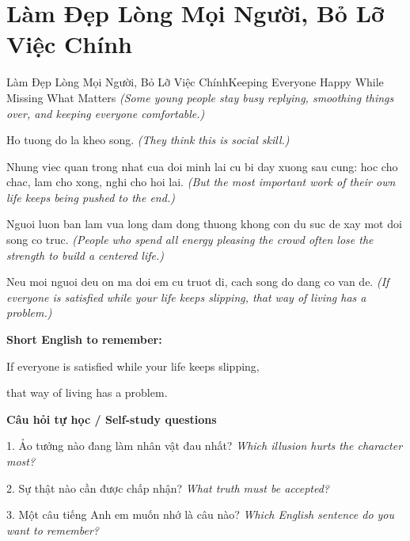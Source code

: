 \section{Làm Đẹp Lòng Mọi Người, Bỏ Lỡ Việc Chính}
\begin{truyen}{Làm Đẹp Lòng Mọi Người, Bỏ Lỡ Việc Chính}{Keeping Everyone Happy While Missing What Matters}
\textit{(Some young people stay busy replying, smoothing things over, and keeping everyone comfortable.)}

Ho tuong do la kheo song.
\textit{(They think this is social skill.)}

Nhung viec quan trong nhat cua doi minh lai cu bi day xuong sau cung: hoc cho chac, lam cho xong, nghi cho hoi lai.
\textit{(But the most important work of their own life keeps being pushed to the end.)}

Nguoi luon ban lam vua long dam dong thuong khong con du suc de xay mot doi song co truc.
\textit{(People who spend all energy pleasing the crowd often lose the strength to build a centered life.)}

\end{truyen}

\begin{baihoc}
Neu moi nguoi deu on ma doi em cu truot di, cach song do dang co van de.
\textit{(If everyone is satisfied while your life keeps slipping, that way of living has a problem.)}
\end{baihoc}

\begin{ghinhoanh}
\textbf{Short English to remember:}

If everyone is satisfied while your life keeps slipping,

that way of living has a problem.

\end{ghinhoanh}

\begin{tuhocnhanh}
\textbf{Câu hỏi tự học / Self-study questions}

1. Ảo tưởng nào đang làm nhân vật đau nhất? \textit{Which illusion hurts the character most?}

2. Sự thật nào cần được chấp nhận? \textit{What truth must be accepted?}

3. Một câu tiếng Anh em muốn nhớ là câu nào? \textit{Which English sentence do you want to remember?}
\end{tuhocnhanh}
\ngancach


